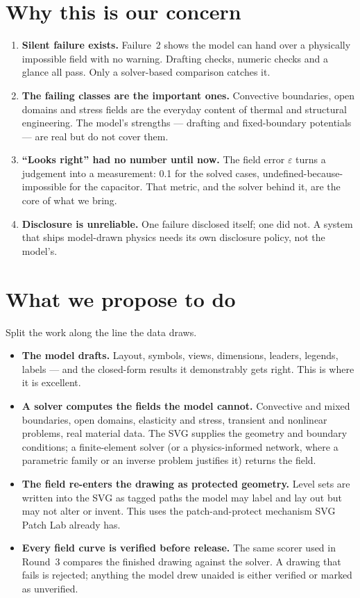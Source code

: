 \documentclass[11pt,a4paper]{article}
\begin{document}
\section{Why this is our concern}
\begin{enumerate}[leftmargin=2em,itemsep=3pt]
  \item \textbf{Silent failure exists.} Failure~2 shows the model can hand over a physically impossible field with no warning. Drafting checks, numeric checks and a glance all pass. Only a solver-based comparison catches it.
  \item \textbf{The failing classes are the important ones.} Convective boundaries, open domains and stress fields are the everyday content of thermal and structural engineering. The model's strengths --- drafting and fixed-boundary potentials --- are real but do not cover them.
  \item \textbf{``Looks right'' had no number until now.} The field error $\varepsilon$ turns a judgement into a measurement: 0.1 for the solved cases, undefined-because-impossible for the capacitor. That metric, and the solver behind it, are the core of what we bring.
  \item \textbf{Disclosure is unreliable.} One failure disclosed itself; one did not. A system that ships model-drawn physics needs its own disclosure policy, not the model's.
\end{enumerate}

\section{What we propose to do}
Split the work along the line the data draws.
\begin{notebox}
\begin{itemize}[leftmargin=1.6em,itemsep=3pt]
  \item \textbf{The model drafts.} Layout, symbols, views, dimensions, leaders, legends, labels --- and the closed-form results it demonstrably gets right. This is where it is excellent.
  \item \textbf{A solver computes the fields the model cannot.} Convective and mixed boundaries, open domains, elasticity and stress, transient and nonlinear problems, real material data. The SVG supplies the geometry and boundary conditions; a finite-element solver (or a physics-informed network, where a parametric family or an inverse problem justifies it) returns the field.
  \item \textbf{The field re-enters the drawing as protected geometry.} Level sets are written into the SVG as tagged paths the model may label and lay out but may not alter or invent. This uses the patch-and-protect mechanism SVG Patch Lab already has.
  \item \textbf{Every field curve is verified before release.} The same scorer used in Round~3 compares the finished drawing against the solver. A drawing that fails is rejected; anything the model drew unaided is either verified or marked as unverified.
\end{itemize}
\end{notebox}
\end{document}
